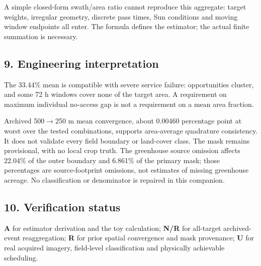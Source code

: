 \documentclass[10pt,a4paper]{article}
\numberwithin{equation}{section}
\begin{document}
\begin{sloppypar}A simple closed-form swath/area ratio cannot reproduce this aggregate: target weights, irregular geometry, discrete pass times, Sun conditions and moving window endpoints all enter. The formula defines the estimator; the actual finite summation is necessary.\end{sloppypar}


\subsection*{9. Engineering interpretation}
\begin{sloppypar}The 33.44\% mean is compatible with severe service failure: opportunities cluster, and some 72 h windows cover none of the target area. A requirement on maximum individual no-access gap is not a requirement on a mean area fraction.\end{sloppypar}


\begin{sloppypar}Archived 500\ensuremath{\to}250 m mean convergence, about 0.00460 percentage point at worst over the tested combinations, supports area-average quadrature consistency. It does not validate every field boundary or land-cover class. The mask remains provisional, with no local crop truth. The greenhouse source omission affects 22.04\% of the outer boundary and 6.861\% of the primary mask; those percentages are source-footprint omissions, not estimates of missing greenhouse acreage. No classification or denominator is repaired in this companion.\end{sloppypar}


\subsection*{10. Verification status}
\begin{sloppypar}\textbf{A} for estimator derivation and the toy calculation; \textbf{N/R} for all-target archived-event reaggregation; \textbf{R} for prior spatial convergence and mask provenance; \textbf{U} for real acquired imagery, field-level classification and physically achievable scheduling.\end{sloppypar}
\end{document}
